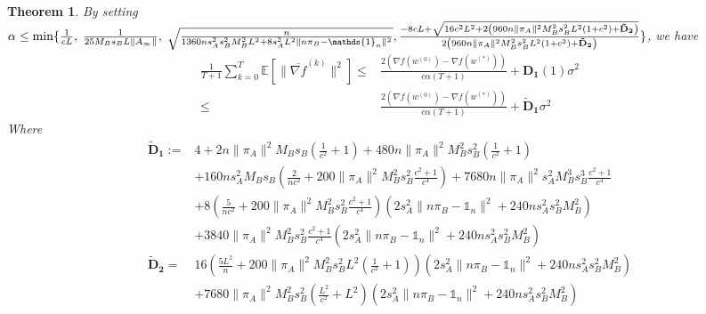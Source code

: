 \documentclass{article}
\newtheorem{theorem}{Theorem}
\newcommand{\EE}[1]{\mathbb{E}\left[#1\right]}
\newcommand{\norm}[1]{\| #1 \|}
\newcommand{\one}{\mathds{1}_n}
\begin{document}
\begin{theorem}
  By setting $\alpha \leq \min\{\frac{1}{cL} ,\;\frac{1}{25M_Bs_BL\norm{A_{\infty}}},\; \sqrt{\frac{n}{1360ns_A^2s_B^2M_B^2L^2+8s_A^2L^2\norm{n\pi_B-\one}^2}},\; \\\frac{-8cL+\sqrt{16c^2L^2+2\left(960n\norm{\pi_A}^2M_B^2s_B^2L^2\left(1+c^2\right)+\mathbf{\tilde{D}_2}\right)}}{2\left(960n\norm{\pi_A}^2M_B^2s_B^2L^2\left(1+c^2\right)+\mathbf{\tilde{D}_2}\right)}\} $, we have 
  \begin{align*}
 \frac{1}{T+1}\sum_{k=0}^T\EE{\norm{\overline{\nabla f}^{(k)}}^2}\leq&\frac{2(\nabla f(w^{(0)})-\nabla f(w^{(*)}))}{c\alpha(T+1)}+\mathbf{D_1}(1)\sigma^2\\
 \leq&\frac{2(\nabla f(w^{(0)})-\nabla f(w^{(*)}))}{c\alpha(T+1)}+\mathbf{\tilde{D}_1}\sigma^2
\end{align*}
  Where 
  \begin{align*}
\mathbf{\tilde{D}_1}:=&4+2n\norm{\pi_A}^2M_Bs_B\left(\frac{1}{c^2}+1\right)+480n\norm{\pi_A}^2M_B^2s_B^2\left(\frac{1}{c^2}+1\right)\\
    &+160ns_A^2M_Bs_B\left(\frac{2}{nc^2}+200\norm{\pi_A}^2M_B^2s_B^2\frac{c^2+1}{c^4}\right)+7680n\norm{\pi_A}^2s_A^2M_B^3s_B^3\frac{c^2+1}{c^4}\\
    &+8\left(\frac{5}{nc^2}+200\norm{\pi_A}^2M_B^2s_B^2\frac{c^2+1}{c^4}\right)\left(2s_A^2\norm{n\pi_B-\one}^2+240ns_A^2s_B^2M_B^2\right)\\
    &+3840\norm{\pi_A}^2M_B^2s_B^2\frac{c^2+1}{c^4}\left(2s_A^2\norm{n\pi_B-\one}^2+240ns_A^2s_B^2M_B^2\right)\\
    \mathbf{\tilde{D}_2}=&16\left(\frac{5L^2}{n}+200\norm{\pi_A}^2M_B^2s_B^2L^2\left(\frac{1}{c^2}+1\right)\right)\left(2s_A^2\norm{n\pi_B-\one}^2+240ns_A^2s_B^2M_B^2\right) \\
  &+7680\norm{\pi_A}^2M_B^2s_B^2\left(\frac{L^2}{c^2}+ L^2\right)\left(2s_A^2\norm{n\pi_B-\one}^2+240ns_A^2s_B^2M_B^2\right)
  \end{align*}
\end{theorem}
\end{document}
